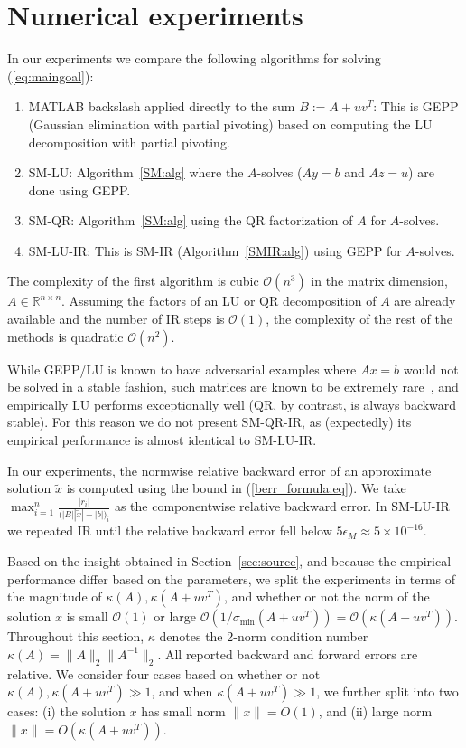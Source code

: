 \documentclass{siamltex}
\newcommand{\eqnref}[1]{(\ref{#1})}
\newcommand{\eps}{\epsilon}
\begin{document}
\section{Numerical experiments}\label{sec:exp}
In our experiments we compare the following algorithms for solving \eqnref{eq:maingoal}:
\begin{enumerate}
\item MATLAB backslash applied directly to the sum $B:= A+uv^T$: This is GEPP (Gaussian elimination with partial pivoting) based on computing the LU decomposition with partial pivoting. 
\item SM-LU: Algorithm~\ref{SM:alg} where the $A$-solves ($Ay=b$ and $Az=u$) are done using GEPP. 
\item SM-QR: Algorithm~\ref{SM:alg} using the QR factorization of $A$ for $A$-solves. 
\item SM-LU-IR: This is SM-IR (Algorithm~\ref{SMIR:alg}) using GEPP for $A$-solves. 
\end{enumerate}
The complexity of the first algorithm is cubic $\mathcal{O}(n^3)$ in the matrix dimension, $A\in\mathbb{R}^{n\times n}$. Assuming the factors of an LU or QR decomposition of $A$ are already available and the number of IR steps is $\mathcal{O}(1)$, the complexity of the rest of the methods is quadratic $\mathcal{O}(n^2)$. 

While GEPP/LU is known to have adversarial examples where $Ax=b$ would not be solved in a stable fashion, such matrices are known to be extremely rare~\cite[Ch.~22]{TB:2022}, and empirically LU performs exceptionally well (QR, by contrast, is always backward stable). For this reason we do not present SM-QR-IR, as (expectedly) its empirical performance is almost identical to SM-LU-IR.

In our experiments, the normwise relative backward error of an approximate solution $\tilde x$ is computed using the bound in \eqnref{berr_formula:eq}. We take $\max_{i=1}^n \frac{ |r_i|}{\big( |B| |\tilde x| + |b| \big)_i}$ as the componentwise relative backward error. In SM-LU-IR we repeated IR until the relative backward error fell below $5\eps_M\approx 5\times 10^{-16}$.

Based on the insight obtained in Section~\ref{sec:source}, and because the empirical performance differ based on the parameters, we split the experiments in terms of the magnitude of $\kappa(A),\kappa(A+uv^T)$, and whether or not the norm of the solution $x$ is small $\mathcal{O}(1)$ or large $\mathcal{O}(1/\sigma_{\min}(A+uv^T)) = \mathcal{O}(\kappa(A+uv^T))$. 
Throughout this section, $\kappa$ denotes the 2-norm condition number $\kappa(A)=\|A\|_2\|A^{-1}\|_2$. All reported backward and forward errors are relative. We consider four cases based on whether or not $\kappa(A),\kappa(A+uv^T)\gg 1$, and when $\kappa(A+uv^T)\gg 1$, we further split into two cases: (i) the solution $x$ has small norm $\|x\|=O(1)$, and (ii) large norm $\|x\|=O(\kappa(A+uv^T))$.
\end{document}
